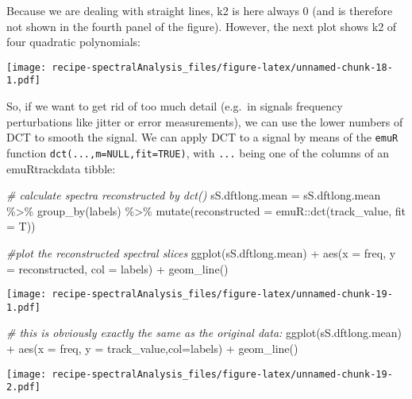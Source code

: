 \documentclass[
]{book}
\newenvironment{Shaded}{\begin{snugshade}}{\end{snugshade}}
\newcommand{\AttributeTok}[1]{\textcolor[rgb]{0.77,0.63,0.00}{#1}}
\newcommand{\CommentTok}[1]{\textcolor[rgb]{0.56,0.35,0.01}{\textit{#1}}}
\newcommand{\FunctionTok}[1]{\textcolor[rgb]{0.00,0.00,0.00}{#1}}
\newcommand{\NormalTok}[1]{#1}
\newcommand{\OtherTok}[1]{\textcolor[rgb]{0.56,0.35,0.01}{#1}}
\newcommand{\SpecialCharTok}[1]{\textcolor[rgb]{0.00,0.00,0.00}{#1}}
\begin{document}
Because we are dealing with straight lines, k2 is here always 0 (and is therefore not shown in the fourth panel of the figure). However, the next plot shows k2 of four quadratic polynomials:

\texttt{[image: recipe-spectralAnalysis\_files/figure-latex/unnamed-chunk-18-1.pdf]}

So, if we want to get rid of too much detail (e.g.~in signals frequency perturbations like jitter or error measurements), we can use the lower numbers of DCT to smooth the signal. We can apply DCT to a signal by means of the \texttt{emuR} function \texttt{dct(...,m=NULL,fit=TRUE)}, with \texttt{...} being one of the columns of an emuRtrackdata tibble:

\begin{Shaded}
\begin{Highlighting}[]
\CommentTok{\# calculate spectra reconstructed by dct() }
\NormalTok{sS.dftlong.mean }\OtherTok{=}\NormalTok{ sS.dftlong.mean }\SpecialCharTok{\%\textgreater{}\%}
  \FunctionTok{group\_by}\NormalTok{(labels) }\SpecialCharTok{\%\textgreater{}\%}
  \FunctionTok{mutate}\NormalTok{(}\AttributeTok{reconstructed =}\NormalTok{ emuR}\SpecialCharTok{::}\FunctionTok{dct}\NormalTok{(track\_value, }\AttributeTok{fit =}\NormalTok{ T))}


\CommentTok{\#plot the reconstructed spectral slices}
\FunctionTok{ggplot}\NormalTok{(sS.dftlong.mean) }\SpecialCharTok{+}
  \FunctionTok{aes}\NormalTok{(}\AttributeTok{x =}\NormalTok{ freq, }\AttributeTok{y =}\NormalTok{ reconstructed, }\AttributeTok{col =}\NormalTok{ labels) }\SpecialCharTok{+}
  \FunctionTok{geom\_line}\NormalTok{()}
\end{Highlighting}
\end{Shaded}

\texttt{[image: recipe-spectralAnalysis\_files/figure-latex/unnamed-chunk-19-1.pdf]}

\begin{Shaded}
\begin{Highlighting}[]
\CommentTok{\# this is obviously exactly the same as the original data: }
\FunctionTok{ggplot}\NormalTok{(sS.dftlong.mean) }\SpecialCharTok{+}
  \FunctionTok{aes}\NormalTok{(}\AttributeTok{x =}\NormalTok{ freq, }\AttributeTok{y =}\NormalTok{ track\_value,}\AttributeTok{col=}\NormalTok{labels) }\SpecialCharTok{+}
  \FunctionTok{geom\_line}\NormalTok{()}
\end{Highlighting}
\end{Shaded}

\texttt{[image: recipe-spectralAnalysis\_files/figure-latex/unnamed-chunk-19-2.pdf]}
\end{document}
